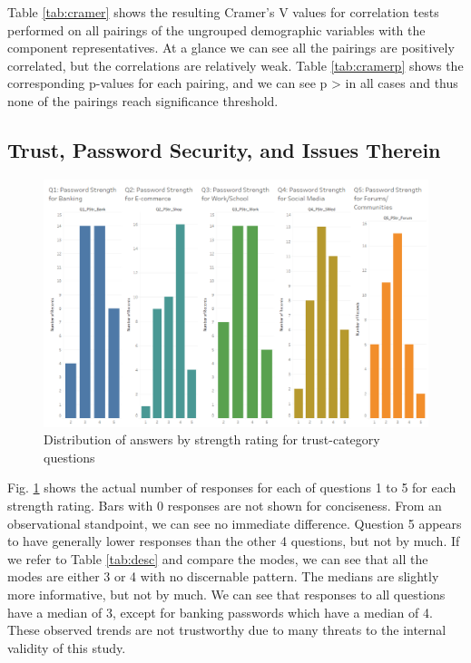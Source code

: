 \documentclass[letterpaper, 10 pt, conference]{ieeeconf}  %
\begin{document}
Table \ref{tab:cramer} shows the resulting Cramer’s V values for correlation tests performed on all pairings of the ungrouped demographic variables with the component representatives. At a glance we can see all the pairings are positively correlated, but the correlations are relatively weak. Table \ref{tab:cramerp} shows the corresponding p-values for each pairing, and we can see p > \textalpha{} in all cases and thus none of the pairings reach significance threshold.

\subsection{Trust, Password Security, and Issues Therein}\label{sec:trust}

  \begin{figure}[thpb]
  \includegraphics[width=1.0\textwidth]{barsQ1Q5.PNG}
     \caption{Distribution of answers by strength rating for trust-category questions}
         \label{fig:barchart}
  \end{figure}

Fig. \ref{fig:barchart} shows the actual number of responses for each of questions 1 to 5 for each strength rating. Bars with 0 responses are not shown for conciseness. From an observational standpoint, we can see no immediate difference. Question 5 appears to have generally lower responses than the other 4 questions, but not by much. If we refer to Table \ref{tab:desc} and compare the modes, we can see that all the modes are either 3 or 4 with no discernable pattern. The medians are slightly more informative, but not by much. We can see that responses to all questions have a median of 3, except for banking passwords which have a median of 4. These observed trends are not trustworthy due to many threats to the internal validity of this study.
\end{document}
